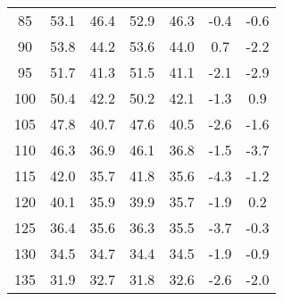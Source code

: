 \begin{longtable}{ccccccc}
    85                         & 53.1                     & 46.4                     & 52.9                       & 46.3                       & -0.4                              & -0.6                              \\
    90                         & 53.8                     & 44.2                     & 53.6                       & 44.0                       & 0.7                               & -2.2                              \\
    95                         & 51.7                     & 41.3                     & 51.5                       & 41.1                       & -2.1                              & -2.9                              \\
    100                        & 50.4                     & 42.2                     & 50.2                       & 42.1                       & -1.3                              & 0.9                               \\
    105                        & 47.8                     & 40.7                     & 47.6                       & 40.5                       & -2.6                              & -1.6                              \\
    110                        & 46.3                     & 36.9                     & 46.1                       & 36.8                       & -1.5                              & -3.7                              \\
    115                        & 42.0                     & 35.7                     & 41.8                       & 35.6                       & -4.3                              & -1.2                              \\
    120                        & 40.1                     & 35.9                     & 39.9                       & 35.7                       & -1.9                              & 0.2                               \\
    125                        & 36.4                     & 35.6                     & 36.3                       & 35.5                       & -3.7                              & -0.3                              \\
    130                        & 34.5                     & 34.7                     & 34.4                       & 34.5                       & -1.9                              & -0.9                              \\
    135                        & 31.9                     & 32.7                     & 31.8                       & 32.6                       & -2.6                              & -2.0                              \\

\end{longtable}
